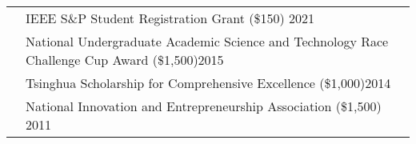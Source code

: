 \documentclass[letterpaper, 11pt]{article}
\begin{document}
\begin{longtable}{p{1.3in}p{4.8in}}

{\color{OliveGreen}{Honors \& Awards}}
& IEEE S\&P Student Registration Grant (\$150) \hfill 2021\\
& National Undergraduate Academic Science and Technology Race Challenge Cup Award (\$1,500)\hfill 2015\\
& Tsinghua Scholarship for Comprehensive Excellence (\$1,000)\hfill2014\\
& National Innovation and Entrepreneurship Association (\$1,500) \hfill2011\\





\end{longtable}
\end{document}
